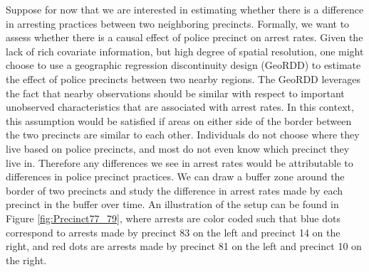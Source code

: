 \documentclass[a4paper,11pt]{article}
\begin{document}
Suppose for now that we are interested in estimating whether there is a difference in arresting practices between two neighboring precincts. Formally, we want to assess whether there is a causal effect of police precinct on arrest rates. Given the lack of rich covariate information, but high degree of spatial resolution, one might choose to use a geographic regression discontinuity design (GeoRDD) to estimate the effect of police precincts between two nearby regions. The GeoRDD leverages the fact that nearby observations should be similar with respect to important unobserved characteristics that are associated with arrest rates. In this context, this assumption would be satisfied if areas on either side of the border between the two precincts are similar to each other. Individuals do not choose where they live based on police precincts, and most do not even know which precinct they live in. Therefore any differences we see in arrest rates would be attributable to differences in police precinct practices. We can draw a buffer zone around the border of two precincts and study the difference in arrest rates made by each precinct in the buffer over time. An illustration of the setup can be found in Figure \ref{fig:Precinct77_79}, where arrests are color coded such that blue dots correspond to arrests made by precinct 83 on the left and precinct 14 on the right, and red dots are arrests made by precinct 81 on the left and precinct 10 on the right. 
\end{document}
